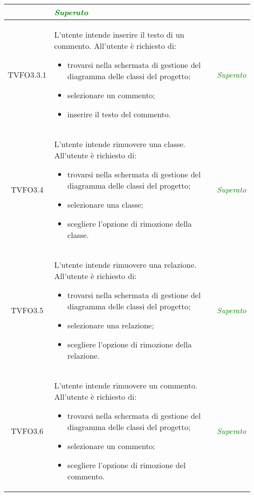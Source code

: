 \begin{longtable}{|c|>{}m{8cm}|c|}
\begin{itemize}
\end{itemize} & \textcolor{Green}{\textit{Superato}}\\ \hline
\hypertarget{TVFO3.3.1}{TVFO3.3.1} & L'utente intende inserire il testo di un commento. 
All'utente è richiesto di: 
\begin{itemize} 
	\item trovarsi nella schermata di gestione del diagramma delle classi del progetto;
	\item selezionare un commento;
	\item inserire il testo del commento.
\end{itemize} & \textcolor{Green}{\textit{Superato}}\\ \hline

\hypertarget{TVFO3.4}{TVFO3.4} & L'utente intende rimuovere una classe.
All'utente è richiesto di:
\begin{itemize}
	\item trovarsi nella schermata di gestione del diagramma delle classi del progetto;
	\item selezionare una classe;
	\item scegliere l'opzione di rimozione della classe.
\end{itemize} & \textcolor{Green}{\textit{Superato}}\\ \hline

\hypertarget{TVFO3.5}{TVFO3.5} & L'utente intende rimuovere una relazione.
All'utente è richiesto di:
\begin{itemize}
	\item trovarsi nella schermata di gestione del diagramma delle classi del progetto;
	\item selezionare una relazione; 
	\item scegliere l'opzione di rimozione della relazione.
\end{itemize} & \textcolor{Green}{\textit{Superato}}\\ \hline

\hypertarget{TVFO3.6}{TVFO3.6} & L'utente intende rimuovere un commento.
All'utente è richiesto di:
\begin{itemize}
	\item trovarsi nella schermata di gestione del diagramma delle classi del progetto;
	\item selezionare un commento;
	\item scegliere l'opzione di rimozione del commento.
\end{itemize} & \textcolor{Green}{\textit{Superato}}\\ \hline


\end{longtable}
